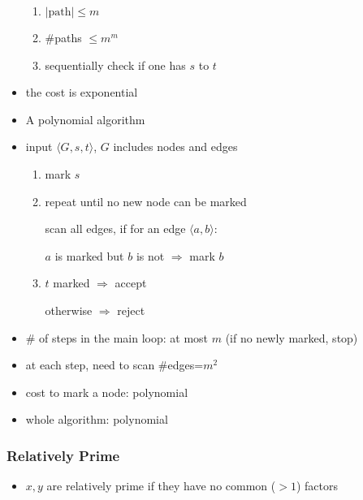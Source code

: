 \begin{frame}[allowframebreaks]
\begin{itemize}
\begin{enumerate}
  \item $|\text{path}|\leq m$

  \item \#paths $\leq m^m$

  \item sequentially check if one has $s$ to $t$

  \end{enumerate}
  \item the cost is exponential  
\item A polynomial algorithm

\item [] input $\langle  G,s,t\rangle $, $G$ includes nodes and edges
\begin{enumerate}
\item mark $s$


\item repeat until no new node can be marked

  \quad scan all edges, if for an edge $\langle  a,b\rangle $:
  \begin{center}
  $a$ is marked but $b$ is not
$\Rightarrow $ mark $b$
\end{center}
\item $t$ marked $\Rightarrow$ accept

otherwise $\Rightarrow$ reject
\end{enumerate}
\item \# of steps in the main loop: at most $m$ (if no newly marked, stop)
\item at each step, need to scan \#edges=$m^2$
\item cost to mark a node: polynomial
\item whole algorithm: polynomial
\end{itemize}\end{frame} \begin{frame}[allowframebreaks] \frametitle{Relatively Prime}
  \begin{itemize}
\item $x,y$ are relatively prime if they have no common ($> 1$) factors


\end{itemize}
\end{frame}
